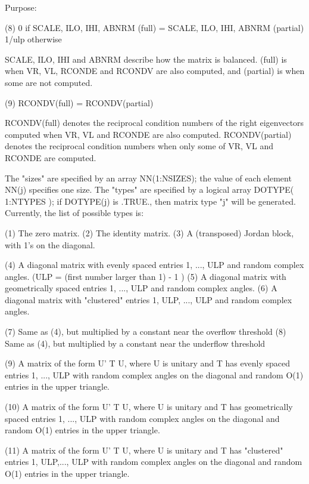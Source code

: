 \begin{DoxyParagraph}{Purpose\+: }
\begin{DoxyVerb}
    (8)     0 if SCALE, ILO, IHI, ABNRM (full) =
                 SCALE, ILO, IHI, ABNRM (partial)
            1/ulp otherwise

      SCALE, ILO, IHI and ABNRM describe how the matrix is balanced.
      (full) is when VR, VL, RCONDE and RCONDV are also computed, and
      (partial) is when some are not computed.

    (9)     RCONDV(full) = RCONDV(partial)

      RCONDV(full) denotes the reciprocal condition numbers of the
      right eigenvectors computed when VR, VL and RCONDE are also
      computed. RCONDV(partial) denotes the reciprocal condition
      numbers when only some of VR, VL and RCONDE are computed.

    The "sizes" are specified by an array NN(1:NSIZES); the value of
    each element NN(j) specifies one size.
    The "types" are specified by a logical array DOTYPE( 1:NTYPES );
    if DOTYPE(j) is .TRUE., then matrix type "j" will be generated.
    Currently, the list of possible types is:

    (1)  The zero matrix.
    (2)  The identity matrix.
    (3)  A (transposed) Jordan block, with 1's on the diagonal.

    (4)  A diagonal matrix with evenly spaced entries
         1, ..., ULP  and random complex angles.
         (ULP = (first number larger than 1) - 1 )
    (5)  A diagonal matrix with geometrically spaced entries
         1, ..., ULP  and random complex angles.
    (6)  A diagonal matrix with "clustered" entries 1, ULP, ..., ULP
         and random complex angles.

    (7)  Same as (4), but multiplied by a constant near
         the overflow threshold
    (8)  Same as (4), but multiplied by a constant near
         the underflow threshold

    (9)  A matrix of the form  U' T U, where U is unitary and
         T has evenly spaced entries 1, ..., ULP with random complex
         angles on the diagonal and random O(1) entries in the upper
         triangle.

    (10) A matrix of the form  U' T U, where U is unitary and
         T has geometrically spaced entries 1, ..., ULP with random
         complex angles on the diagonal and random O(1) entries in
         the upper triangle.

    (11) A matrix of the form  U' T U, where U is unitary and
         T has "clustered" entries 1, ULP,..., ULP with random
         complex angles on the diagonal and random O(1) entries in
         the upper triangle.


\end{DoxyVerb}
\end{DoxyParagraph}
